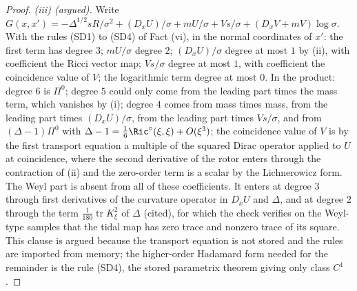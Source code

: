 \begin{proof}
\emph{(iii) (argued).} Write $G(x, x') = -\Delta^{1/2}sR/\sigma^{2} + (D_{x}U)/\sigma + mU/\sigma + Vs/\sigma + (D_{x}V + mV)\log\sigma$. With the rules (SD1) to (SD4) of Fact (vi), in the normal coordinates of $x'$: the first term has degree $3$; $mU/\sigma$ degree $2$; $(D_{x}U)/\sigma$ degree at most $1$ by (ii), with coefficient the Ricci vector map; $Vs/\sigma$ degree at most $1$, with coefficient the coincidence value of $V$; the logarithmic term degree at most $0$. In the product: degree $6$ is $\Pi^{0}$; degree $5$ could only come from the leading part times the mass term, which vanishes by (i); degree $4$ comes from mass times mass, from the leading part times $(D_{x}U)/\sigma$, from the leading part times $Vs/\sigma$, and from $(\Delta - 1)\Pi^{0}$ with $\Delta - 1 = \tfrac16\Ric^{\circ}(\xi, \xi) + O(\xi^{3})$; the coincidence value of $V$ is by the first transport equation a multiple of the squared Dirac operator applied to $U$ at coincidence, where the second derivative of the rotor enters through the contraction of (ii) and the zero-order term is a scalar by the Lichnerowicz form. The Weyl part is absent from all of these coefficients. It enters at degree $3$ through first derivatives of the curvature operator in $D_{x}U$ and $\Delta$, and at degree $2$ through the term $\tfrac1{180}\operatorname{tr}K_{\xi}^{2}$ of $\Delta$ (cited), for which the check verifies on the Weyl-type samples that the tidal map has zero trace and nonzero trace of its square. This clause is argued because the transport equation is not stored and the rules are imported from memory; the higher-order Hadamard form needed for the remainder is the rule (SD4), the stored parametrix theorem giving only class $C^{1}$.


\end{proof}
